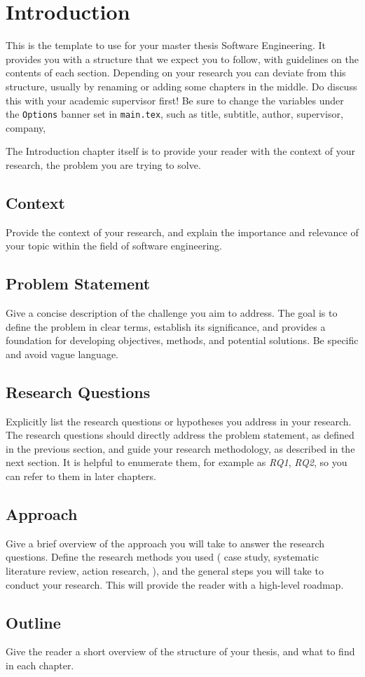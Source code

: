 \chapter{Introduction}\label{ch:introduction}

This is the template to use for your master thesis Software Engineering.
It provides you with a structure that we expect you to follow, with guidelines on the contents of each section.
Depending on your research you can deviate from this structure, usually by renaming or adding some chapters in the middle.
Do discuss this with your academic supervisor first!
Be sure to change the variables under the \verb|Options| banner set in \verb|main.tex|, such as title, subtitle, author, supervisor, company, \etc{}

The Introduction chapter itself is to provide your reader with the context of your research, the problem you are trying to solve.

\section{Context}
Provide the context of your research, and explain the importance and relevance of your topic within the field of software engineering.

\section{Problem Statement}
Give a concise description of the challenge you aim to address.
The goal is to define the problem in clear terms, establish its significance, and provides a foundation for developing objectives, methods, and potential solutions.
Be specific and avoid vague language. 

\section{Research Questions}
Explicitly list the research questions or hypotheses you address in your research.
The research questions should directly address the problem statement, as defined in the previous section, and guide your research methodology, as described in the next section.
It is helpful to enumerate them, for example as \emph{RQ1}, \emph{RQ2}, so you can refer to them in later chapters. 

\section{Approach}
Give a brief overview of the approach you will take to answer the research questions.
Define the research methods you used (\eg{} case study, systematic literature review, action research, \etc{}), and the general steps you will take to conduct your research.
This will provide the reader with a high-level roadmap.

\section{Outline}
Give the reader a short overview of the structure of your thesis, and what to find in each chapter.